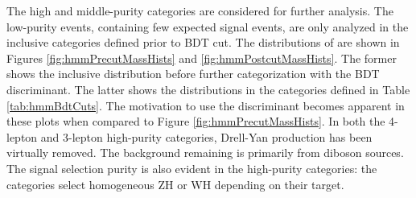 The high and middle-purity categories are considered for further analysis.
The low-purity events, containing few expected signal events, are only analyzed in the inclusive categories defined prior to BDT cut.
The distributions of \muu are shown in Figures \ref{fig:hmmPrecutMassHists} and \ref{fig:hmmPostcutMassHists}.
The former shows the inclusive distribution before further categorization with the BDT discriminant.
The latter shows the distributions in the categories defined in Table \ref{tab:hmmBdtCuts}.
The motivation to use the discriminant becomes apparent in these plots when compared to Figure \ref{fig:hmmPrecutMassHists}.
In both the 4-lepton and 3-lepton high-purity categories, Drell-Yan production has been virtually removed.
The background remaining is primarily from diboson sources.
The signal selection purity is also evident in the high-purity categories: the categories select homogeneous ZH or WH depending on their target.


